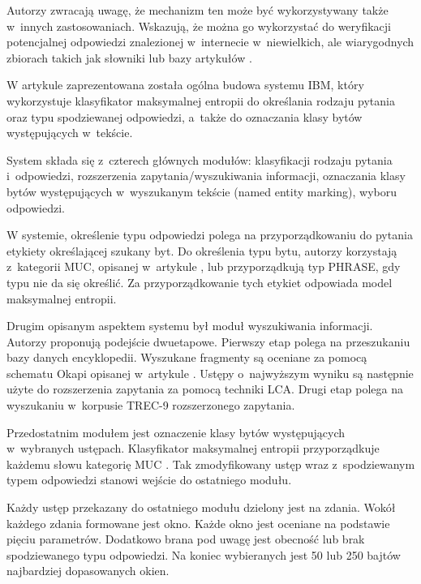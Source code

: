 Autorzy \cite{brill2001data} zwracają uwagę, że mechanizm ten może być wykorzystywany także w~innych zastosowaniach. Wskazują, że można go wykorzystać do weryfikacji potencjalnej odpowiedzi znalezionej w~internecie w~niewielkich, ale wiarygodnych zbiorach takich jak słowniki lub bazy artykułów \cite{brill2001data}.

W artykule \cite{Ittycheriah00ibm'sstatistical} zaprezentowana została ogólna budowa systemu IBM, który wykorzystuje klasyfikator maksymalnej entropii do określania rodzaju pytania oraz typu spodziewanej odpowiedzi, a~także do oznaczania klasy bytów występujących w~tekście. 

System składa się z~czterech głównych modułów: klasyfikacji rodzaju pytania i~odpowiedzi, rozszerzenia zapytania/wyszukiwania informacji, oznaczania klasy bytów występujących w~wyszukanym tekście (named entity marking), wyboru odpowiedzi. 

W systemie, określenie typu odpowiedzi polega na przyporządkowaniu do pytania etykiety określającej szukany byt. Do określenia typu bytu, autorzy korzystają z~kategorii MUC, opisanej w~artykule \cite{chinchor-robinson-1998-appendix}, lub przyporządkują typ PHRASE, gdy typu nie da się określić. Za przyporządkowanie tych etykiet odpowiada model maksymalnej entropii. 

Drugim opisanym aspektem systemu był moduł wyszukiwania informacji. Autorzy proponują podejście dwuetapowe. Pierwszy etap polega na przeszukaniu bazy danych encyklopedii. Wyszukane fragmenty są oceniane za pomocą schematu Okapi opisanej w~artykule \cite{RobertsonOkapi}. Ustępy o~najwyższym wyniku są następnie użyte do rozszerzenia zapytania za pomocą techniki LCA. Drugi etap polega na wyszukaniu w~korpusie TREC-9 rozszerzonego zapytania.

Przedostatnim modułem jest oznaczenie klasy bytów występujących w~wybranych ustępach. Klasyfikator maksymalnej entropii przyporządkuje każdemu słowu kategorię MUC \cite{chinchor-robinson-1998-appendix}. Tak zmodyfikowany ustęp wraz z~spodziewanym typem odpowiedzi stanowi wejście do ostatniego modułu.

Każdy ustęp przekazany do ostatniego modułu dzielony jest na zdania. Wokół każdego zdania formowane jest okno. Każde okno jest oceniane na podstawie pięciu parametrów. Dodatkowo brana pod uwagę jest obecność lub brak spodziewanego typu odpowiedzi. Na koniec wybieranych jest 50 lub 250 bajtów najbardziej dopasowanych okien\cite{Ittycheriah00ibm'sstatistical}. 

